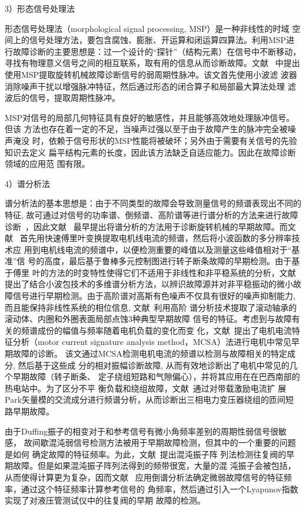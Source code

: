 3）形态信号处理法

形态信号处理法（morphological signal processing, MSP）是一种非线性的时域
空间上的信号处理方法，要包含腐蚀、膨胀、开运算和闭运算四算法。利用MSP进
行故障诊断的主要思想是：过一个设计的“探针”（结构元素）在信号中不断移动，
寻找有物理意义信号之间的相互联系，取有用的信息从而诊断故障。文献~
中提出使用MSP提取旋转机械故障诊断信号的弱周期性脉冲。该文首先使用小波滤
波器消除噪声干扰以增强脉冲特征，然后通过形态的闭合算子和局部最大算法处理
滤波后的信号，提取周期性脉冲。

MSP对信号的局部几何特征具有良好的敏感性，并且能够高效地处理脉冲信号。但该
方法也存在着一定的不足，当噪声过强以至于由于故障产生的脉冲完全被噪声淹没
时，依赖于信号形状的MSP性能将被破坏；另外由于需要有关信号的先验知识去定义
扁平结构元素的长度，因此该方法缺乏自适应能力。因此在故障诊断领域的应用范
围有限。

4）谱分析法

谱分析法的基本思想是：由于不同类型的故障会导致测量信号的频谱表现出不同的
特征, 故可通过对信号的功率谱、倒频谱、高阶谱等进行谱分析的方法来进行故障
诊断~\cite{liuxuexia2008high, yu2005application}，因此文献~
最早提出将谱分析的方法用于诊断旋转机械的早期故障。而文献~
首先用快速傅里叶变换提取电机线电流的频谱，然后将小波函数的多分辨率技术应
用到电机线电流的频谱中，以便检测重要的峰值以及测量这些峰值相对于“基准”信
号的高度，最后基于鲁棒多元控制图进行转子断条故障的早期检测。由于基于傅里
叶的方法的时变特性使得它们不适用于非线性和非平稳系统的分析，文献~
提出了结合小波包技术的多维谱分析方法，以辨识故障源并对非平稳振动的微小故
障信号进行早期检测。由于高阶谱对高斯有色噪声不仅具有很好的噪声抑制能力, 
而且能保持非线性系统的相位信息, 文献~利用高阶
谱分析技术提取了滚动轴承的滚动体、内圈和外圈表面局部点蚀3种典型早期故障
信号的特征。考虑到与故障有关的频谱成份的幅值与频率随着电机负载的变化而变
化，文献~提出了电机电流特征分析（motor 
current signature analysis method，MCSA）法进行电机中常见早期故障的诊断。
该文通过MCSA检测电机电流的频谱以检测与故障相关的特定成分, 然后基于这些成
分的相对振幅诊断故障, 从而有效地诊断出了电机中常见的几个早期故障（转子断条、
定子绕组短路和气隙偏心），并将其应用在在巴西南部的热电站中。为了区分不平
衡负载和绕组故障，文献~通过对带载激励电流扩
展Park矢量模的交流成分进行频谱分析，从而诊断出三相电力变压器绕组的匝间短
路早期故障。

由于Duffing振子的相变对于和参考信号有微小角频率差别的周期性弱信号很敏感，
故间歇混沌弱信号检测方法被用于早期故障检测，但其中的一个重要的问题是如何
确定故障的特征频率。为此，文献~提出混沌振子阵
列法检测往复阀的早期故障。但是如果混沌振子阵列法得到的频带很宽，大量的混
沌振子会被包括，从而使得计算更为复杂，因而文献~
应用倒谱分析法确定微弱故障信号的特征频率，通过这个特征频率计算参考信号的
角频率，然后通过引入一个Lyapunov指数实现了对液压管测试仪中的往复阀的早期
故障的检测。

